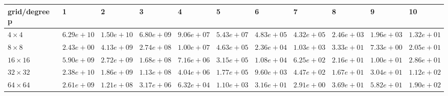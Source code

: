 \begin{tabular}{lllllllllll}
\hline
 grid/degree p   & 1          & 2          & 3          & 4          & 5          & 6          & 7          & 8          & 9          & 10         \\
\hline
 $4 \times 4$    & $6.29e+10$ & $1.50e+10$ & $6.80e+09$ & $9.06e+07$ & $5.43e+07$ & $4.83e+05$ & $4.32e+05$ & $2.46e+03$ & $1.96e+03$ & $1.32e+01$ \\
 $8 \times 8$    & $2.43e+00$ & $4.13e+09$ & $2.74e+08$ & $1.00e+07$ & $4.63e+05$ & $2.36e+04$ & $1.03e+03$ & $3.33e+01$ & $7.33e+00$ & $2.05e+01$ \\
 $16 \times 16$  & $5.90e+09$ & $2.72e+09$ & $1.68e+08$ & $7.16e+06$ & $3.15e+05$ & $1.08e+04$ & $6.25e+02$ & $2.16e+01$ & $1.00e+01$ & $2.86e+01$ \\
 $32 \times 32$  & $2.38e+10$ & $1.86e+09$ & $1.13e+08$ & $4.04e+06$ & $1.77e+05$ & $9.60e+03$ & $4.47e+02$ & $1.67e+01$ & $3.04e+01$ & $1.12e+02$ \\
 $64 \times 64$  & $2.61e+09$ & $1.21e+08$ & $3.17e+06$ & $6.32e+04$ & $1.10e+03$ & $3.16e+01$ & $2.91e+00$ & $3.69e+01$ & $5.82e+01$ & $1.90e+02$ \\
\hline
\end{tabular}